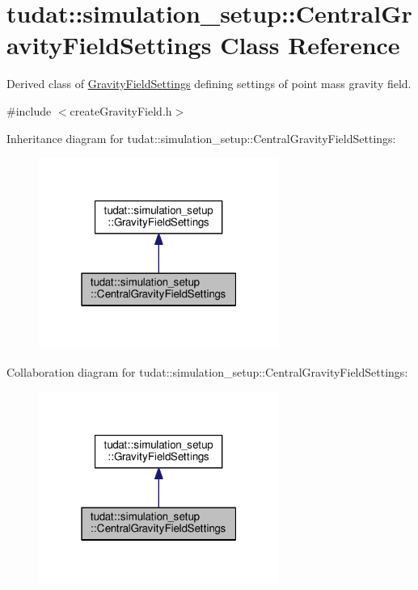 \hypertarget{classtudat_1_1simulation__setup_1_1CentralGravityFieldSettings}{}\section{tudat\+:\+:simulation\+\_\+setup\+:\+:Central\+Gravity\+Field\+Settings Class Reference}
\label{classtudat_1_1simulation__setup_1_1CentralGravityFieldSettings}


Derived class of \hyperlink{classtudat_1_1simulation__setup_1_1GravityFieldSettings}{Gravity\+Field\+Settings} defining settings of point mass gravity field.  




{\ttfamily \#include $<$create\+Gravity\+Field.\+h$>$}



Inheritance diagram for tudat\+:\+:simulation\+\_\+setup\+:\+:Central\+Gravity\+Field\+Settings\+:
\nopagebreak
\begin{figure}[H]
\begin{center}
\leavevmode
\includegraphics[width=223pt]{classtudat_1_1simulation__setup_1_1CentralGravityFieldSettings__inherit__graph}
\end{center}
\end{figure}


Collaboration diagram for tudat\+:\+:simulation\+\_\+setup\+:\+:Central\+Gravity\+Field\+Settings\+:
\nopagebreak
\begin{figure}[H]
\begin{center}
\leavevmode
\includegraphics[width=223pt]{classtudat_1_1simulation__setup_1_1CentralGravityFieldSettings__coll__graph}
\end{center}
\end{figure}
